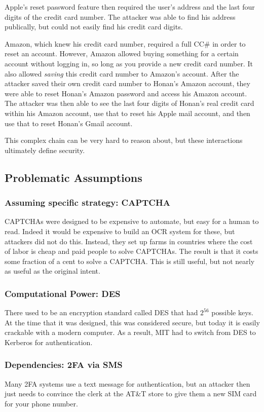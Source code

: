 Apple's reset password feature then required the user's address and the last four digits of the credit card number. The attacker was able to find his address publically, but could not easily find his credit card digits.

Amazon, which knew his credit card number, required a full CC\# in order to reset an account. However, Amazon allowed buying something for a certain account without logging in, so long as you provide a new credit card number. It also allowed \textit{saving} this credit card number to Amazon's account. After the attacker saved their own credit card number to Honan's Amazon account, they were able to reset Honan's Amazon password and access his Amazon account. The attacker was then able to see the last four digits of Honan's real credit card within his Amazon account, use that to reset his Apple mail account, and then use that to reset Honan's Gmail account.

This complex chain can be very hard to reason about, but these interactions ultimately define security.

\subsection{Problematic Assumptions}
\subsubsection{Assuming specific strategy: CAPTCHA}
CAPTCHAs were designed to be expensive to automate, but easy for a human to read. Indeed it would be expensive to build an OCR system for these, but attackers did not do this. Instead, they set up farms in countries where the cost of labor is cheap and paid people to solve CAPTCHAs. The result is that it costs some fraction of a cent to solve a CAPTCHA. This is still useful, but not nearly as useful as the original intent.

\subsubsection{Computational Power: DES}
There used to be an encryption standard called DES that had $2^{56}$ possible keys. At the time that it was designed, this was considered secure, but today it is easily crackable with a modern computer. As a result, MIT had to switch from DES to Kerberos for authentication.

\subsubsection{Dependencies: 2FA via SMS}
Many 2FA systems use a text message for authentication, but an attacker then just needs to convince the clerk at the AT\&T store to give them a new SIM card for your phone number.

